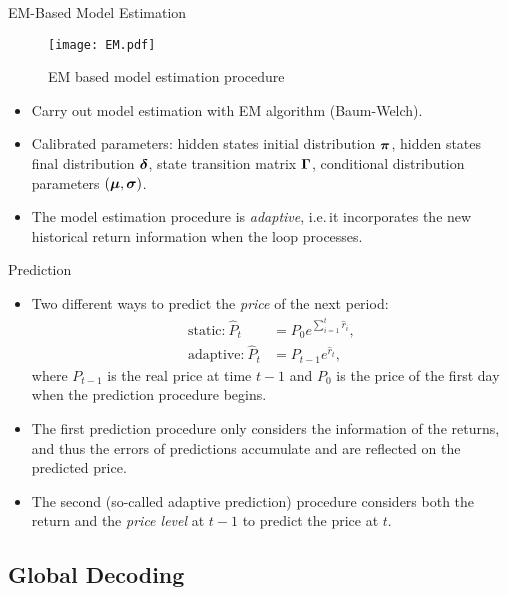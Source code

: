 \begin{frame}[fragile,t]{EM-Based Model Estimation}
	\begin{figure}[!hbt]
    \center
    \texttt{[image: EM.pdf]}
    \caption{EM based model estimation procedure}
    \label{fig:system:EM}
    \end{figure}

    \begin{itemize}
    \item Carry out model estimation with EM algorithm (Baum-Welch).
    \item Calibrated parameters: hidden states initial distribution ${\boldsymbol\pi}$, 
    	hidden states final distribution ${\boldsymbol\delta}$,
    	state transition matrix ${\boldsymbol\Gamma}$, 
    	conditional distribution parameters $({\boldsymbol\mu},{\boldsymbol\sigma})$.
    \item The model estimation procedure is \textit{adaptive}, 
    	i.e.\,it incorporates the new historical return information when the loop processes.
    \end{itemize}
\end{frame}

\begin{frame}[fragile,t]{Prediction}
    \begin{itemize}
    \item Two different ways to predict the \textit{price} of the next period:
    	\[ \begin{aligned}
		\text{static:}\ \hat{P}_t & = P_0 e^{\sum_{i=1}^{t}\hat{r}_i}, \\
		\text{adaptive:}\ \hat{P}_t & = P_{t-1} e^{\hat{r}_t},
		\end{aligned} \]
		where $P_{t-1}$ is the real price at time $t-1$ and 
		$P_0$ is the price of the first day when the prediction procedure begins.
    \item The first prediction procedure only considers the information of the returns, 
    	and thus the errors of predictions accumulate and are reflected on the predicted price.
    \item The second (so-called \alert{adaptive prediction}) procedure considers both the return and 
    	the \textit{price level} at $t-1$ to predict the price at $t$.
    \end{itemize}
\end{frame}


\subsection{Global Decoding}

